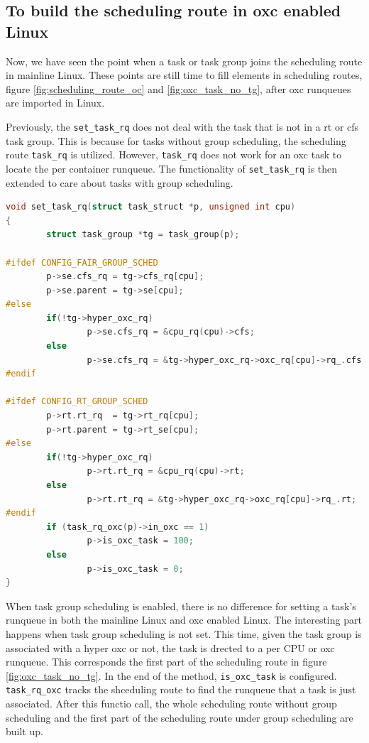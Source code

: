 \subsection{To build the scheduling route in oxc enabled Linux}
Now, we have seen the point when a task or task group joins the scheduling 
route in mainline Linux. These points are still time to fill elements in 
scheduling routes, figure \ref{fig:scheduling_route_oc} and 
\ref{fig:oxc_task_no_tg}, after oxc runqueues are imported in Linux.

Previously, the \texttt{set\_task\_rq} does not deal with the task that is
not in a rt or cfs task group. This is because for tasks without group
scheduling, the scheduling route \texttt{task\_rq} is utilized.
However, \texttt{task\_rq} does not work for an oxc task to locate the
per container runqueue. The functionality of \texttt{set\_task\_rq} is
then extended to care about tasks with group scheduling. 
\begin{lstlisting}[language=C, 
        caption={The extended \texttt{set\_task\_rq}}]
void set_task_rq(struct task_struct *p, unsigned int cpu)
{
        struct task_group *tg = task_group(p);

#ifdef CONFIG_FAIR_GROUP_SCHED
        p->se.cfs_rq = tg->cfs_rq[cpu];
        p->se.parent = tg->se[cpu];
#else
        if(!tg->hyper_oxc_rq)
                p->se.cfs_rq = &cpu_rq(cpu)->cfs;
        else
                p->se.cfs_rq = &tg->hyper_oxc_rq->oxc_rq[cpu]->rq_.cfs;
#endif

#ifdef CONFIG_RT_GROUP_SCHED
        p->rt.rt_rq  = tg->rt_rq[cpu];
        p->rt.parent = tg->rt_se[cpu];
#else
        if(!tg->hyper_oxc_rq)
                p->rt.rt_rq = &cpu_rq(cpu)->rt;
        else
                p->rt.rt_rq = &tg->hyper_oxc_rq->oxc_rq[cpu]->rq_.rt;
#endif
        if (task_rq_oxc(p)->in_oxc == 1)
                p->is_oxc_task = 100;
        else
                p->is_oxc_task = 0;
}
\end{lstlisting}
                                                  
When task group scheduling is enabled, there is no difference for setting a 
task's runqueue in both
the mainline Linux and oxc enabled Linux. The interesting part happens when 
task group scheduling is not set. This time, given the task group is associated
with a hyper oxc or not, the task is drected to a per CPU or oxc runqueue. This 
corresponds the first part of the scheduling route in figure 
\ref{fig:oxc_task_no_tg}. In the end of the method, \texttt{is\_oxc\_task} is 
configured. 
\texttt{task\_rq\_oxc} tracks the shceduling route to find the runqueue that
a task is just associated.
After this functio call, the whole scheduling route without group scheduling
and the first part of the scheduling route under group scheduling are built up.

